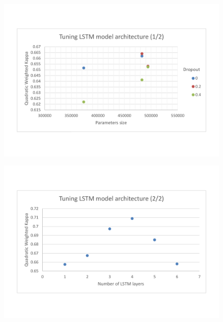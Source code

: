 \documentclass[a4paper,12pt,english]{article}
\begin{document}
\begin{center}
\vspace*{-1.5cm}
\includegraphics[width=0.85\textwidth]{fig/tune_lstm_arch_1.pdf}
\vspace*{-1.5cm}
\end{center}

\begin{center}
\vspace*{-1.5cm}
\includegraphics[width=0.85\textwidth]{fig/tune_lstm_arch_2.pdf}
\vspace*{-1.5cm}
\end{center}
\end{document}
